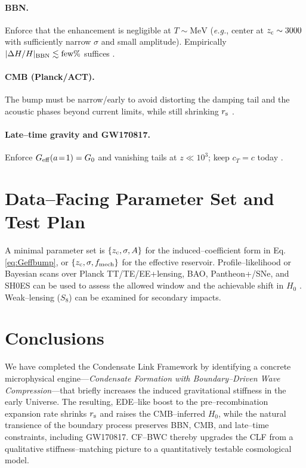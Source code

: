 \documentclass[11pt,a4paper]{article}
\newcommand{\rs}{r_{\rm s}}
\newcommand{\Geff}{G_{\rm eff}}
\newcommand{\zc}{z_{\rm c}}
\begin{document}
\paragraph{BBN.} Enforce that the enhancement is negligible at $T\!\sim\!\mathrm{MeV}$ (\emph{e.g.}, center at $\zc\sim 3000$ with sufficiently narrow $\sigma$ and small amplitude). Empirically $|\Delta H/H|_{\rm BBN}\lesssim\mathrm{few}\%$ suffices \cite{Alvey2020}.

\paragraph{CMB (Planck/ACT).} The bump must be narrow/early to avoid distorting the damping tail and the acoustic phases beyond current limits, while still shrinking $\rs$ \cite{Planck2018,EDEReview2023,PoulinReview2023}.

\paragraph{Late--time gravity and GW170817.} Enforce $\Geff(a\!=\!1)=G_0$ and vanishing tails at $z\!\ll\!10^3$; keep $c_T=c$ today \cite{GW170817}.

\section{Data--Facing Parameter Set and Test Plan}
A minimal parameter set is $\{\zc,\sigma,A\}$ for the induced--coefficient form in Eq.\,\eqref{eq:Geffbump}, or $\{\zc,\sigma,f_{\rm mech}\}$ for the effective reservoir. Profile--likelihood or Bayesian scans over Planck TT/TE/EE+lensing, BAO, Pantheon+/SNe, and SH0ES can be used to assess the allowed window and the achievable shift in $H_0$ \cite{Planck2018,RiessReview2024}. Weak--lensing ($S_8$) can be examined for secondary impacts.

\section{Conclusions}
We have completed the Condensate Link Framework by identifying a concrete microphysical engine---\emph{Condensate Formation with Boundary--Driven Wave Compression}---that briefly increases the induced gravitational stiffness in the early Universe. The resulting, EDE--like boost to the pre--recombination expansion rate shrinks $\rs$ and raises the CMB--inferred $H_0$, while the natural transience of the boundary process preserves BBN, CMB, and late--time constraints, including GW170817. CF--BWC thereby upgrades the CLF from a qualitative stiffness--matching picture to a quantitatively testable cosmological model.
\end{document}

